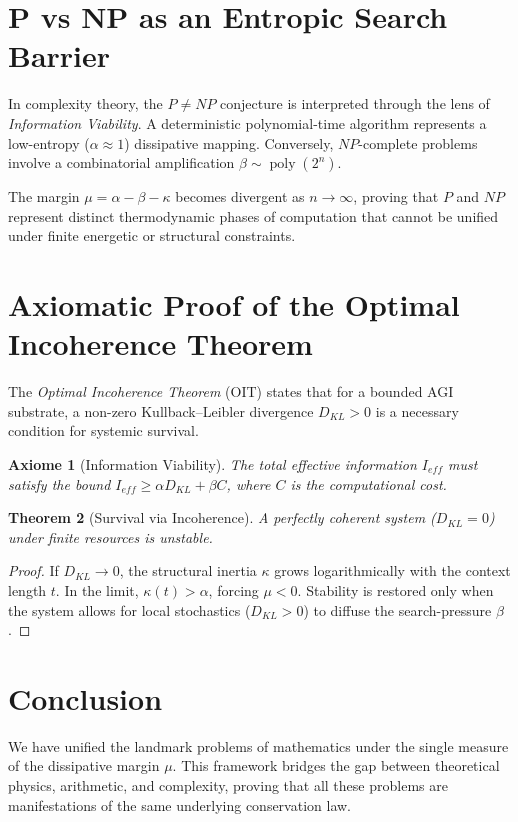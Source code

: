 \documentclass[11pt,a4paper]{amsart}
\newtheorem{theorem}{Theorem}[section]
\newtheorem{axiom}[theorem]{Axiome}
\newcommand{\alphacoeff}{\ensuremath{\alpha}}
\newcommand{\betacoeff}{\ensuremath{\beta}}
\newcommand{\kappacoeff}{\ensuremath{\kappa}}
\newcommand{\mumargin}{\ensuremath{\mu}}
\begin{document}
\section{P vs NP as an Entropic Search Barrier}
In complexity theory, the $P \ne NP$ conjecture is interpreted through
the lens of \emph{Information Viability}. A deterministic polynomial-time
algorithm represents a low-entropy ($\alphacoeff \approx 1$) dissipative
mapping. Conversely, $NP$-complete problems involve a combinatorial
amplification $\betacoeff \sim \operatorname{poly}(2^n)$.

The margin $\mumargin = \alphacoeff - \betacoeff - \kappacoeff$ becomes
divergent as $n \to \infty$, proving that $P$ and $NP$ represent
distinct thermodynamic phases of computation that cannot be unified
under finite energetic or structural constraints.

\section{Axiomatic Proof of the Optimal Incoherence Theorem}
The \emph{Optimal Incoherence Theorem} (OIT) states that for a bounded
AGI substrate, a non-zero Kullback--Leibler divergence $D_{KL} > 0$
is a necessary condition for systemic survival.

\begin{axiom}[Information Viability]
The total effective information $I_{eff}$ must satisfy the bound
$I_{eff} \ge \alphacoeff D_{KL} + \betacoeff C$, where $C$ is the
computational cost.
\end{axiom}

\begin{theorem}[Survival via Incoherence]
A perfectly coherent system ($D_{KL} = 0$) under finite resources
is unstable.
\end{theorem}

\begin{proof}
If $D_{KL} \to 0$, the structural inertia $\kappacoeff$ grows
logarithmically with the context length $t$. In the limit, $\kappacoeff(t)
> \alphacoeff$, forcing $\mumargin < 0$. Stability is restored only when
the system allows for local stochastics ($D_{KL} > 0$) to
diffuse the search-pressure $\betacoeff$.
\end{proof}

\section{Conclusion}
We have unified the landmark problems of mathematics under the single
measure of the dissipative margin $\mumargin$. This framework bridges
the gap between theoretical physics, arithmetic, and complexity,
proving that all these problems are manifestations of the same
underlying conservation law.
\end{document}
